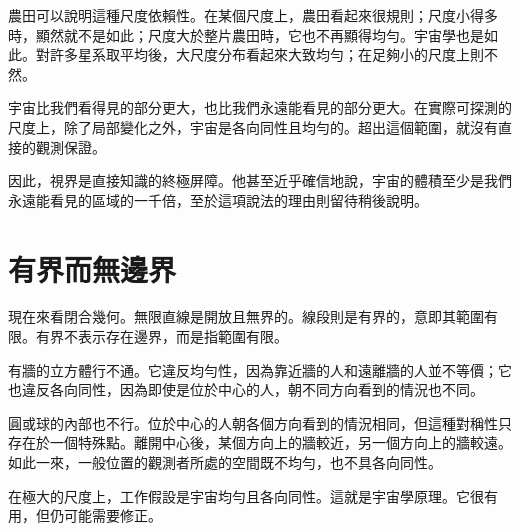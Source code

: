 農田可以說明這種尺度依賴性。在某個尺度上，農田看起來很規則；尺度小得多時，顯然就不是如此；尺度大於整片農田時，它也不再顯得均勻。宇宙學也是如此。對許多星系取平均後，大尺度分布看起來大致均勻；在足夠小的尺度上則不然。

宇宙比我們看得見的部分更大，也比我們永遠能看見的部分更大。在實際可探測的尺度上，除了局部變化之外，宇宙是各向同性且均勻的。超出這個範圍，就沒有直接的觀測保證。

\begin{classroomqa}
\end{classroomqa}

\begin{classroomqa}
\end{classroomqa}

因此，視界是直接知識的終極屏障。他甚至近乎確信地說，宇宙的體積至少是我們永遠能看見的區域的一千倍，至於這項說法的理由則留待稍後說明。

\section{有界而無邊界}

現在來看閉合幾何。無限直線是開放且無界的。線段則是有界的，意即其範圍有限。有界不表示存在邊界，而是指範圍有限。

有牆的立方體行不通。它違反均勻性，因為靠近牆的人和遠離牆的人並不等價；它也違反各向同性，因為即使是位於中心的人，朝不同方向看到的情況也不同。

圓或球的內部也不行。位於中心的人朝各個方向看到的情況相同，但這種對稱性只存在於一個特殊點。離開中心後，某個方向上的牆較近，另一個方向上的牆較遠。如此一來，一般位置的觀測者所處的空間既不均勻，也不具各向同性。

在極大的尺度上，工作假設是宇宙均勻且各向同性。這就是宇宙學原理。它很有用，但仍可能需要修正。

\begin{classroomqa}
\end{classroomqa}

